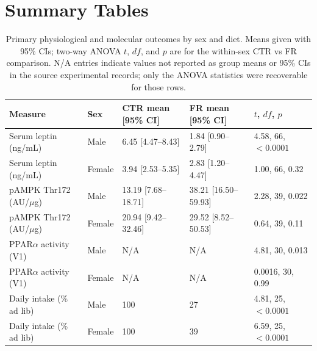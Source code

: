 \documentclass[11pt]{article}
\begin{document}
\section{Summary Tables}

\begin{table}[htbp]
\centering
\caption{Primary physiological and molecular outcomes by sex and diet. Means given with 95\% CIs; two-way ANOVA $t$, $df$, and $p$ are for the within-sex CTR vs FR comparison. N/A entries indicate values not reported as group means or 95\% CIs in the source experimental records; only the ANOVA statistics were recoverable for those rows.}
\label{tab:primary}
\begin{tabular}{lllll}
\toprule
Measure & Sex & CTR mean [95\% CI] & FR mean [95\% CI] & $t$, $df$, $p$ \\
\midrule
Serum leptin (ng/mL) & Male & 6.45 [4.47--8.43] & 1.84 [0.90--2.79] & 4.58, 66, $<0.0001$ \\
Serum leptin (ng/mL) & Female & 3.94 [2.53--5.35] & 2.83 [1.20--4.47] & 1.00, 66, 0.32 \\
pAMPK Thr172 (AU/$\mu$g) & Male & 13.19 [7.68--18.71] & 38.21 [16.50--59.93] & 2.28, 39, 0.022 \\
pAMPK Thr172 (AU/$\mu$g) & Female & 20.94 [9.42--32.46] & 29.52 [8.52--50.53] & 0.64, 39, 0.11 \\
PPAR$\alpha$ activity (V1) & Male & N/A & N/A & 4.81, 30, 0.013 \\
PPAR$\alpha$ activity (V1) & Female & N/A & N/A & 0.0016, 30, 0.99 \\
Daily intake (\% ad lib) & Male & 100 & 27 & 4.81, 25, $<0.0001$ \\
Daily intake (\% ad lib) & Female & 100 & 39 & 6.59, 25, $<0.0001$ \\
\bottomrule
\end{tabular}
\end{table}
\end{document}
